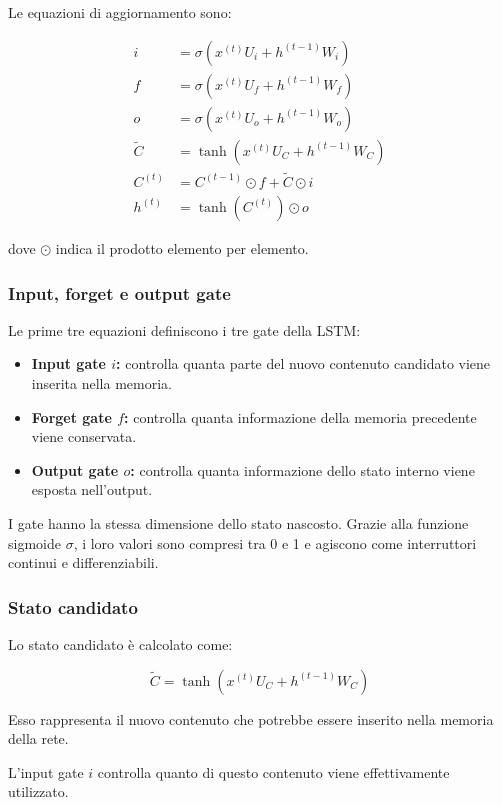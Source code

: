 \documentclass[11pt,a4paper]{article}
\begin{document}
Le equazioni di aggiornamento sono:

\[
\begin{aligned}
i &= \sigma\left(x^{(t)}U_i+h^{(t-1)}W_i\right)\\
f &= \sigma\left(x^{(t)}U_f+h^{(t-1)}W_f\right)\\
o &= \sigma\left(x^{(t)}U_o+h^{(t-1)}W_o\right)\\
\widetilde{C} &=
\tanh\left(x^{(t)}U_C+h^{(t-1)}W_C\right)\\
C^{(t)} &= C^{(t-1)}\odot f+\widetilde{C}\odot i\\
h^{(t)} &= \tanh\left(C^{(t)}\right)\odot o
\end{aligned}
\]

dove $\odot$ indica il prodotto elemento per elemento.

\subsubsection{Input, forget e output gate}

Le prime tre equazioni definiscono i tre gate della LSTM:

\begin{itemize}
    \item \textbf{Input gate $i$:} controlla quanta parte del nuovo contenuto candidato viene inserita nella memoria.
    \item \textbf{Forget gate $f$:} controlla quanta informazione della memoria precedente viene conservata.
    \item \textbf{Output gate $o$:} controlla quanta informazione dello stato interno viene esposta nell'output.
\end{itemize}

I gate hanno la stessa dimensione dello stato nascosto. Grazie alla funzione sigmoide $\sigma$, i loro valori sono compresi tra 0 e 1 e 
agiscono come interruttori continui e differenziabili.

\subsubsection{Stato candidato}

Lo stato candidato è calcolato come:

\[
\widetilde{C}
=
\tanh\left(x^{(t)}U_C+h^{(t-1)}W_C\right)
\]

Esso rappresenta il nuovo contenuto che potrebbe essere inserito nella memoria della rete.

L'input gate $i$ controlla quanto di questo contenuto viene effettivamente utilizzato.
\end{document}
